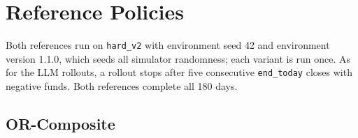 \section{Reference Policies}
\label{appendix:reference_policies}

Both references run on \texttt{hard\_v2} with environment seed 42 and environment version 1.1.0, which seeds all simulator randomness; each variant is run once. As for the LLM rollouts, a rollout stops after five consecutive \texttt{end\_today} closes with negative funds. Both references complete all 180 days.

\subsection{OR-Composite}
\label{appendix:or_composite}

